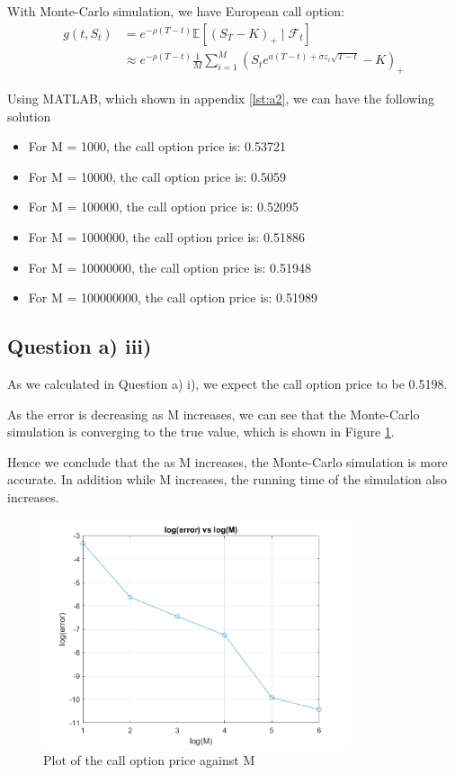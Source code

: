 \documentclass[12pt]{article}
\begin{document}
With Monte-Carlo simulation, we have European call option:
\[
    \begin{aligned}
        g\left(t, S_t\right) & =e^{-\rho(T-t)}
        \mathbb{E}\left[\left(S_T-K\right)_{+}
            \mid \mathcal{F}_t\right]
        \\
                             & \approx e^{-\rho(T-t)} \frac{1}{M}
        \sum_{i=1}^M\left(S_t e^{a(T-t)+\sigma z_i
                \sqrt{T-t}}-K\right)_{+}
    \end{aligned}
\]

Using MATLAB, which shown in appendix \ref{lst:a2}, we can have the following
solution

\begin{itemize}
    \item For M = 1000, the call option price is: 0.53721
    \item For M = 10000, the call option price is: 0.5059
    \item For M = 100000, the call option price is: 0.52095
    \item For M = 1000000, the call option price is: 0.51886
    \item For M = 10000000, the call option price is: 0.51948
    \item For M = 100000000, the call option price is: 0.51989
\end{itemize}

\subsection{Question a) iii)}

As we calculated in Question a) i), we expect the call option price to be
0.5198.

As the error is decreasing as M increases, we can see that the Monte-Carlo
simulation is converging to the true value, which is shown in Figure
\ref{fig:a_3}.

Hence we conclude that the as M increases, the Monte-Carlo simulation is more
accurate. In addition while M increases, the running time of the simulation
also increases.
\begin{figure}[htbp]
    \caption{Plot of the call option price against M}
    \label{fig:a_3}
    \centering
    \includegraphics[width=0.8\textwidth]{imgs/a_2.png}
\end{figure}
\end{document}
